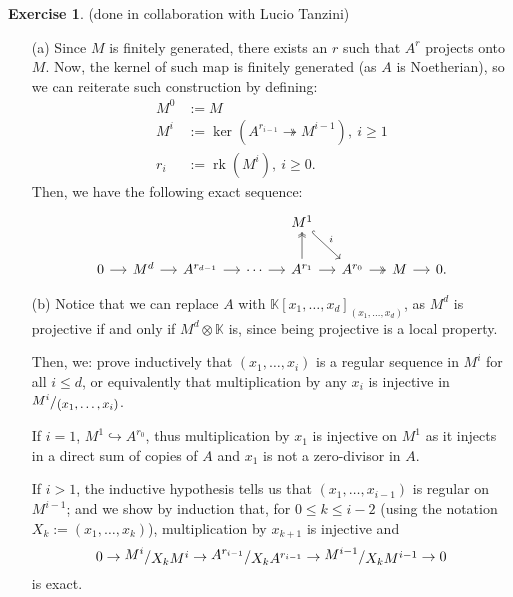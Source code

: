 \documentclass[a4paper]{article}
\newcommand{\K}{\mathbb{K}}
\newcommand{\sfrac}[2]{
    \raisebox{+0.3ex}{$#1$}
    /
    \raisebox{-0.3ex}{$#2$}
}
\newcommand{\ssfrac}[2]{
    \raisebox{+0.3ex}{\scalebox{0.9}{$#1$}}
    /
    \raisebox{-0.3ex}{\scalebox{0.9}{$#2$}}
}
\theoremstyle{definition}
\theoremstyle{definition}
\theoremstyle{remark}
\theoremstyle{definition}
\newtheorem{exercise}{Exercise}[section]
\begin{document}
\begin{exercise}
(done in collaboration with Lucio Tanzini)\

	\begin{itemize}
		\item[(a)] Since $M$ is finitely generated, there exists an $r$ such that $A^{r}$ projects onto $M$. Now, the kernel of such map is finitely generated (as $A$ is
		Noetherian), so we can reiterate such construction by defining:
		\begin{align*}
			M^0&:=M\\
			M^i&:=\ker\left( A^{r_{i-1}}\twoheadrightarrow M^{i-1} \right),~i\geq1\\
			r_i&:=\operatorname{rk}\left( M^i \right),~i\geq0.
		\end{align*}
		Then, we have the following exact sequence:
		\begin{equation*}
			\begin{tikzcd}[column sep=small]
				&&&&{M^1} \ar[rd, "i", hook]\\
				0\rar & M^d\rar&{A^{r_{d-1}}}\rar&{\cdots}\rar&{A^{r_1}} \rar\ar[u, two heads] & {A^{r_0}} \rar[two heads] & {M} \rar & 0.
			\end{tikzcd}
		\end{equation*}
	\item[(b)] Notice that we can replace $A$ with $\K[x_1,\dots,x_d]_{(x_1,\dots,x_d)}$, as $M^d$ is projective if and only if $M^d\otimes\K$ is, since being projective is a
		local property.

		Then, we: prove inductively that $(x_1,\dots,x_i)$ is a regular sequence in $M^i$ for all $i\leq d$, or equivalently that multiplication by any $x_i$ is injective
		in $\ssfrac{M^i}{(x_1,\dots,x_i)}$.

		If $i=1$, $M^1\hookrightarrow A^{r_0}$, thus multiplication by $x_1$ is injective on $M^1$ as it injects in a direct sum of copies of $A$ and $x_1$ is not a
		zero-divisor in $A$.

		If $i>1$, the inductive hypothesis tells us that $(x_1,\dots,x_{i-1})$ is regular on $M^{i-1}$; and we show by induction that, for $0\leq k\leq
		i-2$ (using the
		notation $X_k:=(x_1,\dots,x_k)$), multiplication by $x_{k+1}$ is injective and \begin{equation}\label{eq:snake}
			0\rightarrow \sfrac{M^i}{X_k M^i}\rightarrow
			\sfrac{A^{r_{i-1}}}{X_k
		A^{r_{i-1}}}\rightarrow\sfrac{M^{i-1}}{X_k M^{i-1}}\rightarrow 0
	\end{equation}
		is exact.


\end{itemize}
\end{exercise}
\end{document}
